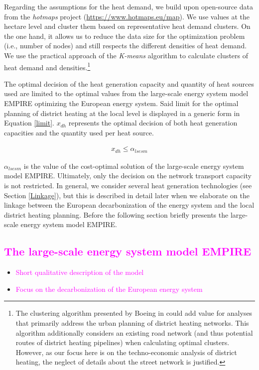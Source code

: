 Regarding the assumptions for the heat demand, we build upon open-source data from the \textit{hotmaps} project (\url{https://www.hotmaps.eu/map}). We use values at the hectare level and cluster them based on representative heat demand clusters. On the one hand, it allows us to reduce the data size for the optimization problem (i.e., number of nodes) and still respects the different densities of heat demand. We use the practical approach of the \textit{K-means} algorithm to calculate clusters of heat demand and densities.\footnote{The clustering algorithm presented by Boeing in \cite{boeing2018clustering} could add value for analyses that primarily address the urban planning of district heating networks. This algorithm additionally considers an existing road network (and thus potential routes of district heating pipelines) when calculating optimal clusters. However, as our focus here is on the techno-economic analysis of district heating, the neglect of details about the street network is justified.} \vspace{0.5cm}

The optimal decision of the heat generation capacity and quantity of heat sources used are limited to the optimal values from the large-scale energy system model EMPIRE optimizing the European energy system. Said limit for the optimal planning of district heating at the local level is displayed in a generic form in Equation \ref{limit}. $x_{dh}$ represents the optimal decision of both heat generation capacities and the quantity used per heat source. 

\begin{align}\label{limit}
	x_{dh} \leq \alpha_{lsesm}
\end{align}

$\alpha_{lsesm}$ is the value of the cost-optimal solution of the large-scale energy system model EMPIRE. Ultimately, only the decision on the network transport capacity is not restricted. In general, we consider several heat generation technologies (see Section \ref{Linkage}), but this is described in detail later when we elaborate on the linkage between the European decarbonization of the energy system and the local district heating planning. Before the following section briefly presents the large-scale energy system model EMPIRE.

\subsection{\textcolor{magenta}{The large-scale energy system model EMPIRE}}\label{Type2}
\begin{itemize}
	\item \textcolor{magenta}{Short qualitative description of the model}
	\item \textcolor{magenta}{Focus on the decarbonization of the European energy system}
\end{itemize}

